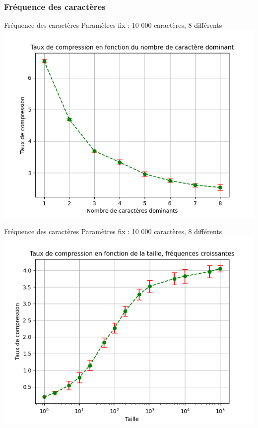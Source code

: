 \documentclass{beamer}
\begin{document}
\subsubsection{Fréquence des caractères}
\begin{frame}{Fréquence des caractères}
    Paramètres fix : 10 000 caractères, 8 différents
    \includegraphics[scale=0.66]{freq_dom.png}
\end{frame}
\begin{frame}{Fréquence des caractères}
    Paramètres fix : 10 000 caractères, 8 différents
    \includegraphics[scale=0.66]{freq_croiss.png}
\end{frame}
\end{document}
